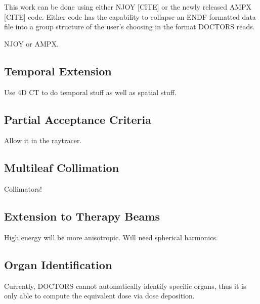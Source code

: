 This work can be done using either NJOY [CITE] or the newly released AMPX [CITE] code. Either code has the capability to collapse an ENDF formatted data file into a group structure of the user's choosing in the format DOCTORS reads.

NJOY or AMPX.

\subsection{Temporal Extension}
Use 4D CT to do temporal stuff as well as spatial stuff.

\subsection{Partial Acceptance Criteria}
Allow it in the raytracer.

\subsection{Multileaf Collimation}
Collimators!

\subsection{Extension to Therapy Beams}
High energy will be more anisotropic. Will need spherical harmonics.

\subsection{Organ Identification}
Currently, DOCTORS cannot automatically identify specific organs, thus it is only able to compute the equivalent dose via dose deposition.

\endinput
